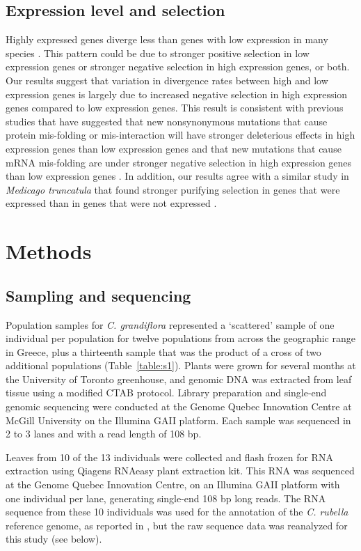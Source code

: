 \subsection{Expression level and selection}
	Highly expressed genes diverge less than genes with low expression in many species \citep{pal2001, subramanian2004, Drummond2006-pa,slotte2011genomic, yang2012, lemos2005,clark2007, carneiro2012}. This pattern could be due to stronger positive selection in low expression genes or stronger negative selection in high expression genes, or both. Our results suggest that variation in divergence rates between high and low expression genes is largely due to increased negative selection in high expression genes compared to low expression genes. This result is consistent with previous studies that have suggested that new nonsynonymous mutations that cause protein mis-folding or mis-interaction will have stronger deleterious effects in high expression genes than low expression genes and that new mutations that cause mRNA mis-folding are under stronger negative selection in high expression genes than low expression genes \citep{park2013, yang2012, drummond2008}. In addition, our results agree with a similar study in \textit{Medicago truncatula} that found stronger purifying selection in genes that were expressed than in genes that were not expressed \citep{paape2013}. 


\section{Methods}
\subsection{Sampling and sequencing}
Population samples for \textit{C. grandiflora} represented a ‘scattered’ sample of one individual per population for twelve populations from across the geographic range in Greece, plus a thirteenth sample that was the product of a cross of two additional populations (Table~\ref{table:s1}). Plants were grown for several months at the University of Toronto greenhouse, and genomic DNA was extracted from leaf tissue using a modified CTAB protocol. Library preparation and single-end genomic sequencing were conducted at the Genome Quebec Innovation Centre at McGill University on the Illumina GAII platform. Each sample was sequenced in 2 to 3 lanes and with a read length of 108 bp.

Leaves from 10 of the 13 individuals were collected and flash frozen for RNA extraction using Qiagen\textsc{}s RNAeasy plant extraction kit. This RNA was sequenced at the Genome Quebec Innovation Centre, on an Illumina GAII platform with one individual per lane, generating single-end 108 bp long reads. The RNA sequence from these 10 individuals was used for the annotation of the \textit{C. rubella} reference genome, as reported in \citep{Slotte2013-py}, but the raw sequence data was reanalyzed for this study (see below).

